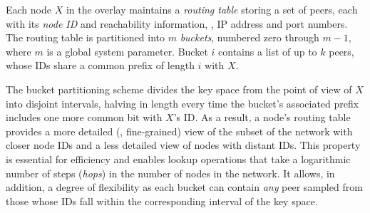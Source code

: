 Each node $X$ in the overlay maintains a \emph{routing table} storing a set of peers, each with its \emph{node ID} and reachability information, \ie, IP address and port numbers.
The routing table is partitioned into $m$ \textit{buckets}, numbered zero through $m-1$, where $m$ is a global system parameter.
Bucket $i$ contains a list of up to $k$ peers, whose IDs share a common prefix of length $i$ with $X$.



%
The bucket partitioning scheme divides the key space from the point of view of $X$ into disjoint intervals, halving in length every time the bucket's associated prefix includes one more common bit with $X$'s ID.
As a result, a node's routing table provides a more detailed (\ie, fine-grained) view of the subset of the network with closer node IDs and a less detailed view of nodes with distant IDs.
This property is essential for efficiency and enables lookup operations that take a logarithmic number of steps (\emph{hops}) in the number of nodes in the network.
It allows, in addition, a degree of flexibility as each bucket can contain \textit{any} peer sampled from those whose IDs fall within the corresponding interval of the key space.


